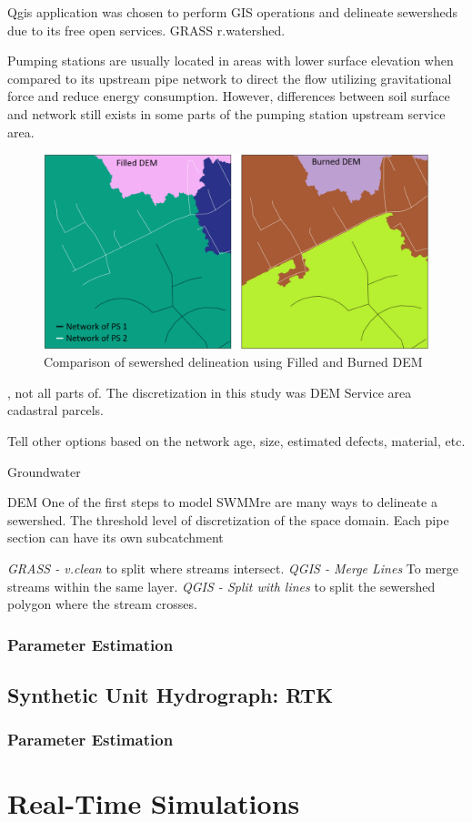 Qgis application was chosen to perform GIS operations and delineate sewersheds due to its free open services. GRASS r.watershed. 


Pumping stations are usually located in areas with lower surface elevation when compared to its upstream pipe network to direct the flow utilizing gravitational force and reduce energy consumption. However, differences between soil surface and network still exists in some parts of the pumping station upstream service area. 


\begin{figure}[h]
    \centering
	\includegraphics[scale=0.6]{figures/burnedxfilledDEM.png}
	\caption{Comparison of sewershed delineation using Filled and Burned DEM}
	\label{fig:filledxburned}
\end{figure}


, not all parts of.
The discretization in this study was DEM  Service area cadastral parcels.

Tell other options based on the network age, size, estimated defects, material, etc. 


Groundwater
         
DEM One of the first steps to model SWMMre are many ways to delineate a sewershed. The threshold level of discretization of the space domain. Each pipe section can have its own subcatchment 
          
          
         \textit{GRASS - v.clean} to split where streams intersect.
         \textit{QGIS - Merge Lines} To merge streams within the same layer. 
         \textit{QGIS - Split with lines} to split the sewershed polygon where the stream crosses.
        
        
        \subsubsection{Parameter Estimation}
    
    \subsection{Synthetic Unit Hydrograph: RTK}
        
        \subsubsection{Parameter Estimation}
        
\section{Real-Time Simulations}